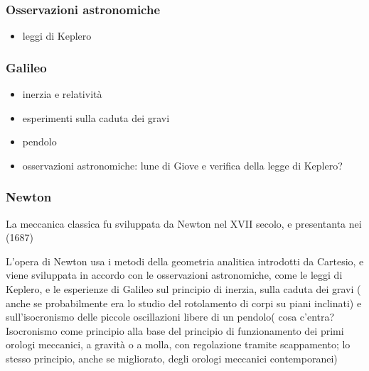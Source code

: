 \documentclass[letterpaper,10pt,italian]{jupyterBook}
\begin{document}
\subsubsection{Osservazioni astronomiche}
\label{\detokenize{ch/mechanics/intro-history:osservazioni-astronomiche}}\begin{itemize}
\item {} 
\sphinxAtStartPar
leggi di Keplero

\end{itemize}


\subsubsection{Galileo}
\label{\detokenize{ch/mechanics/intro-history:galileo}}\begin{itemize}
\item {} 
\sphinxAtStartPar
inerzia e relatività

\item {} 
\sphinxAtStartPar
esperimenti sulla caduta dei gravi

\item {} 
\sphinxAtStartPar
pendolo

\item {} 
\sphinxAtStartPar
osservazioni astronomiche: lune di Giove e verifica della legge di Keplero?

\end{itemize}


\subsubsection{Newton}
\label{\detokenize{ch/mechanics/intro-history:newton}}
\sphinxAtStartPar
La meccanica classica fu sviluppata da Newton nel XVII secolo, e presentanta nei  (1687)  

\sphinxAtStartPar
L’opera di Newton  usa i metodi della geometria analitica introdotti da Cartesio, e viene sviluppata in accordo con le osservazioni astronomiche, come le leggi di Keplero, e le esperienze di Galileo sul principio di inerzia, sulla caduta dei gravi ( anche se probabilmente era lo studio del rotolamento di corpi su piani inclinati) e sull’isocronismo delle piccole oscillazioni libere di un pendolo( cosa c’entra? Isocronismo come principio alla base del principio di funzionamento dei primi orologi meccanici, a gravità o a molla, con regolazione tramite scappamento; lo stesso principio, anche se migliorato, degli orologi meccanici contemporanei)
\end{document}
